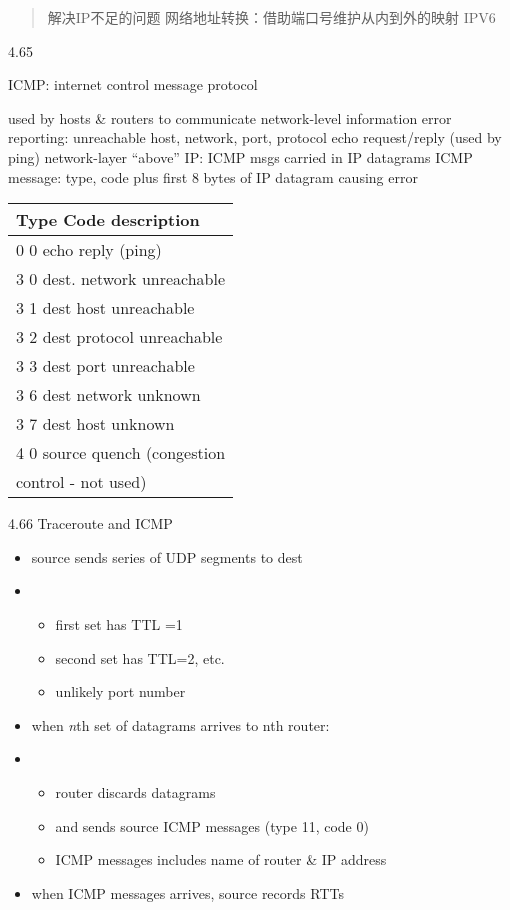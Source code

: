 \documentclass[
]{article}
\begin{document}
\begin{quote}
解决IP不足的问题 网络地址转换：借助端口号维护从内到外的映射 IPV6
\end{quote}

4.65

ICMP: internet control message protocol

used by hosts \& routers to communicate network-level information error
reporting: unreachable host, network, port, protocol echo request/reply
(used by ping) network-layer ``above'' IP: ICMP msgs carried in IP
datagrams ICMP message: type, code plus first 8 bytes of IP datagram
causing error

\begin{longtable}[]{@{}l@{}}
\toprule
Type Code description\tabularnewline
\midrule
\endhead
0 0 echo reply (ping)\tabularnewline
3 0 dest. network unreachable\tabularnewline
3 1 dest host unreachable\tabularnewline
3 2 dest protocol unreachable\tabularnewline
3 3 dest port unreachable\tabularnewline
3 6 dest network unknown\tabularnewline
3 7 dest host unknown\tabularnewline
4 0 source quench (congestion\tabularnewline
control - not used)\tabularnewline
\bottomrule
\end{longtable}

4.66 Traceroute and ICMP

\begin{itemize}
\item
  source sends series of UDP segments to dest
\item
  \begin{itemize}
  \item
    first set has TTL =1
  \item
    second set has TTL=2, etc.
  \item
    unlikely port number
  \end{itemize}
\item
  when \emph{n}th set of datagrams arrives to nth router:
\item
  \begin{itemize}
  \item
    router discards datagrams
  \item
    and sends source ICMP messages (type 11, code 0)
  \item
    ICMP messages includes name of router \& IP address
  \end{itemize}
\item
  when ICMP messages arrives, source records RTTs
\end{itemize}
\end{document}
